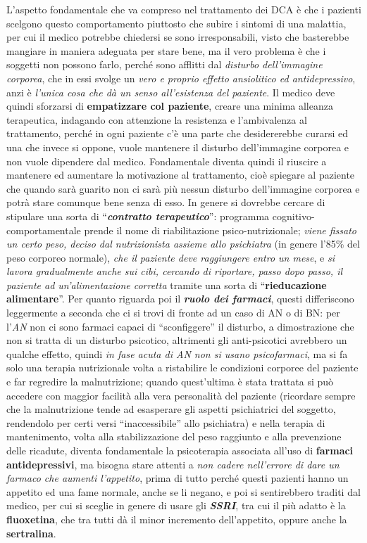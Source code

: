 L'aspetto fondamentale che va compreso nel trattamento dei DCA è che i
pazienti scelgono questo comportamento piuttosto che subire i sintomi di
una malattia, per cui il medico potrebbe chiedersi se sono
irresponsabili, visto che basterebbe mangiare in maniera adeguata per
stare bene, ma il vero problema è che i soggetti non possono farlo,
perché sono afflitti dal \emph{disturbo dell'immagine corporea}, che in
essi svolge un \emph{vero e proprio effetto ansiolitico ed
antidepressivo}, anzi è \emph{l'unica cosa che dà un senso all'esistenza
del paziente}. Il medico deve quindi sforzarsi di \textbf{empatizzare
col paziente}, creare una minima alleanza terapeutica, indagando con
attenzione la resistenza e l'ambivalenza al trattamento, perché in ogni
paziente c'è una parte che desidererebbe curarsi ed una che invece si
oppone, vuole mantenere il disturbo dell'immagine corporea e non vuole
dipendere dal medico. Fondamentale diventa quindi il riuscire a
mantenere ed aumentare la motivazione al trattamento, cioè spiegare al
paziente che quando sarà guarito non ci sarà più nessun disturbo
dell'immagine corporea e potrà stare comunque bene senza di esso. In
genere si dovrebbe cercare di stipulare una sorta di
``\textbf{\emph{contratto terapeutico}}'': programma
cognitivo-comportamentale prende il nome di riabilitazione
psico-nutrizionale; \emph{viene fissato un certo peso, deciso dal
nutrizionista assieme allo psichiatra} (in genere l'85\% del peso
corporeo normale), \emph{che il paziente deve raggiungere entro un
mese}, e \emph{si lavora gradualmente anche sui cibi, cercando di
riportare, passo dopo passo, il paziente ad un'alimentazione corretta}
tramite una sorta di ``\textbf{rieducazione alimentare}''. Per quanto
riguarda poi il \textbf{\emph{ruolo dei farmaci}}, questi differiscono
leggermente a seconda che ci si trovi di fronte ad un caso di AN o di
BN: per l'\emph{AN} non ci sono farmaci capaci di ``sconfiggere'' il
disturbo, a dimostrazione che non si tratta di un disturbo psicotico,
altrimenti gli anti-psicotici avrebbero un qualche effetto, quindi
\emph{in fase acuta di AN non si usano psicofarmaci}, ma si fa solo una
terapia nutrizionale volta a ristabilire le condizioni corporee del
paziente e far regredire la malnutrizione; quando quest'ultima è stata
trattata si può accedere con maggior facilità alla vera personalità del
paziente (ricordare sempre che la malnutrizione tende ad esasperare gli
aspetti psichiatrici del soggetto, rendendolo per certi versi
``inaccessibile'' allo psichiatra) e nella terapia di mantenimento,
volta alla stabilizzazione del peso raggiunto e alla prevenzione delle
ricadute, diventa fondamentale la psicoterapia associata all'uso di
\textbf{farmaci antidepressivi}, ma bisogna stare attenti a \emph{non
cadere nell'errore di dare un farmaco che aumenti l'appetito}, prima di
tutto perché questi pazienti hanno un appetito ed una fame normale,
anche se li negano, e poi si sentirebbero traditi dal medico, per cui si
sceglie in genere di usare gli \textbf{\emph{SSRI}}, tra cui il più
adatto è la \textbf{fluoxetina}, che tra tutti dà il minor incremento
dell'appetito, oppure anche la \textbf{sertralina}.

